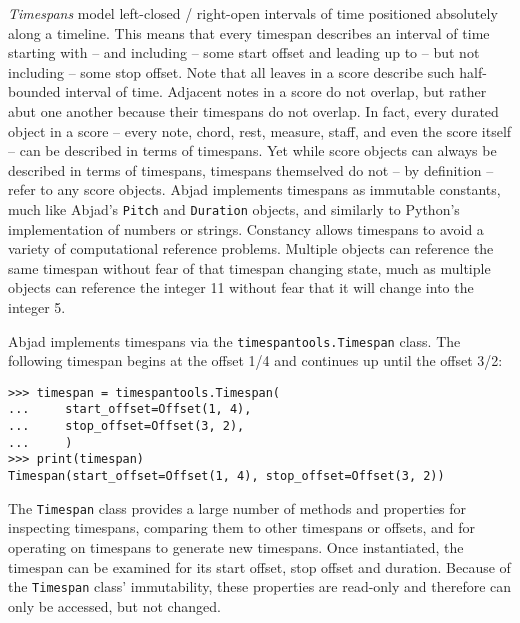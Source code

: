 \emph{Timespans} model left-closed / right-open intervals of time positioned
absolutely along a timeline. This means that every timespan describes an
interval of time starting with -- and including -- some start offset and
leading up to -- but not including -- some stop offset. Note that all leaves in
a score describe such half-bounded interval of time. Adjacent notes in a score
do not overlap, but rather abut one another because their timespans do not
overlap. In fact, every durated object in a score -- every note, chord, rest,
measure, staff, and even the score itself -- can be described in terms of
timespans. Yet while score objects can always be described in terms of
timespans, timespans themselved do not -- by definition -- refer to any score
objects. Abjad implements timespans as immutable constants, much like Abjad's
\texttt{Pitch} and \texttt{Duration} objects, and similarly to Python's
implementation of numbers or strings. Constancy allows timespans to avoid a
variety of computational reference problems. Multiple objects can reference the
same timespan without fear of that timespan changing state, much as multiple
objects can reference the integer 11 without fear that it will change into the
integer 5.

Abjad implements timespans via the \texttt{timespantools.Timespan} class. The
following timespan begins at the offset 1/4 and continues up until the offset
3/2:

\begin{comment}
<abjad>
timespan = timespantools.Timespan(
    start_offset=Offset(1, 4),
    stop_offset=Offset(3, 2),
    )
print(timespan)
</abjad>
\end{comment}

\begin{singlespacing}
\vspace{-0.5\baselineskip}
\begin{lstlisting}
>>> timespan = timespantools.Timespan(
...     start_offset=Offset(1, 4),
...     stop_offset=Offset(3, 2),
...     )
>>> print(timespan)
Timespan(start_offset=Offset(1, 4), stop_offset=Offset(3, 2))
\end{lstlisting}
\end{singlespacing}

\noindent The \texttt{Timespan} class provides a large number of methods and
properties for inspecting timespans, comparing them to other timespans or
offsets, and for operating on timespans to generate new timespans. Once
instantiated, the timespan can be examined for its start offset, stop offset
and duration. Because of the \texttt{Timespan} class' immutability, these
properties are read-only and therefore can only be accessed, but not changed.

